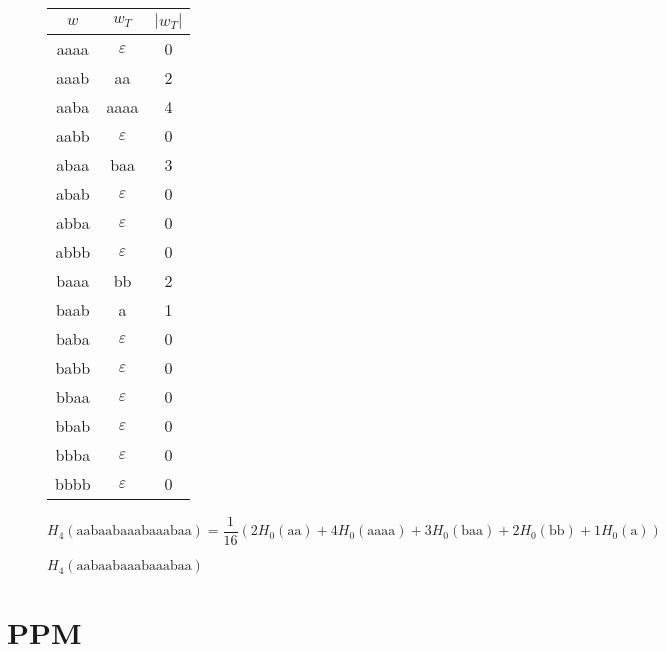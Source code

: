 \begin{figure}
  \begin{center}
  \begin{tabular}{c|c|c}
    $w$ & $w_T$ & $|w_T|$ \\
    \hline
    aaaa & $\varepsilon$ & 0 \\
    aaab & aa & 2 \\
    aaba & aaaa & 4 \\
    aabb & $\varepsilon$ & 0 \\
    abaa & baa & 3 \\
    abab & $\varepsilon$ & 0 \\
    abba & $\varepsilon$ & 0 \\
    abbb & $\varepsilon$ & 0 \\
    baaa & bb & 2 \\
    baab & a & 1 \\
    baba & $\varepsilon$ & 0 \\
    babb & $\varepsilon$ & 0 \\
    bbaa & $\varepsilon$ & 0 \\
    bbab & $\varepsilon$ & 0 \\
    bbba & $\varepsilon$ & 0 \\
    bbbb & $\varepsilon$ & 0 \\
  \end{tabular}
  \end{center}
    $$H_{4}(\text{aabaabaaabaaabaa}) = \frac{1}{16} (2 H_{0}(\text{aa}) + 4 H_{0}(\text{aaaa}) + 3 H_{0}(\text{baa}) + 2 H_{0}(\text{bb}) + 1 H_{0}(\text{a}))$$
  \caption{$H_{4}(\text{aabaabaaabaaabaa})$}
\end{figure}

\section{PPM}

